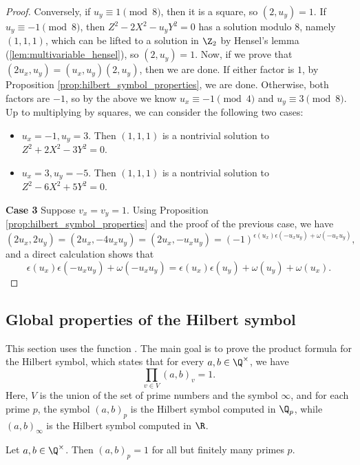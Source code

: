 \begin{proof}
		Conversely, if $u_y \equiv 1 \pmod 8$, then it is a square, so $(2, u_y)=1$.
		If $u_y \equiv -1 \pmod 8$, then $Z^2-2X^2-u_yY^2=0$ has a solution modulo $8$, namely $(1,1,1)$,
		which can be lifted to a solution in $\Z_2$ by Hensel's lemma (\ref{lem:multivariable_hensel}),
		so $(2, u_y)=1$. Now, if we prove that $(2u_x,u_y)=(u_x,u_y)(2,u_y)$, then we are done. If either
		factor is $1$, by Proposition \ref{prop:hilbert_symbol_properties}, we are done. Otherwise, both
		factors are $-1$, so by the above we know $u_x \equiv -1 \pmod 4$ and $u_y \equiv 3 \pmod 8$. Up
		to multiplying by squares, we can consider the following two cases:
		\begin{itemize}
			\item $u_x=-1,u_y=3$. Then $(1,1,1)$ is a nontrivial solution to $Z^2+2X^2-3Y^2=0$.
			\item $u_x=3,u_y=-5$. Then $(1,1,1)$ is a nontrivial solution to $Z^2-6X^2+5Y^2=0$.
		\end{itemize}

		\noindent\textbf{Case 3} Suppose $v_x=v_y=1$. Using Proposition \ref{prop:hilbert_symbol_properties} and the proof
		of the previous case, we have
		\[
		(2u_x,2u_y)=(2u_x,-4u_xu_y)=(2u_x,-u_xu_y)=(-1)^{\epsilon(u_x)\epsilon(-u_xu_y)+\omega(-u_xu_y)},
		\]
		and a direct calculation shows that
		\[
		\epsilon(u_x)\epsilon(-u_xu_y)+\omega(-u_xu_y) = \epsilon(u_x)\epsilon(u_y) + \omega(u_y) + \omega(u_x).
		\]
\end{proof}

\subsection{Global properties of the Hilbert symbol}

This section uses the \mathlib function . The main goal is to prove
the product formula for the Hilbert symbol, which states that for every $a, b \in \Q^\times$, we have
\[\prod_{v \in V} (a, b)_v = 1.\]
Here, $V$ is the union of the set of prime numbers and the symbol $\infty$, and for each prime $p$,
the symbol $(a, b)_p$ is the Hilbert symbol computed in $\Q_p$, while $(a, b)_\infty$ is the Hilbert
symbol computed in $\R$.


\begin{theorem}
	\label{thm:almost_all_one}
	\leanok
Let $a, b \in \Q^\times$. Then $(a, b)_p = 1$ for all but finitely many primes $p$.
\end{theorem}


